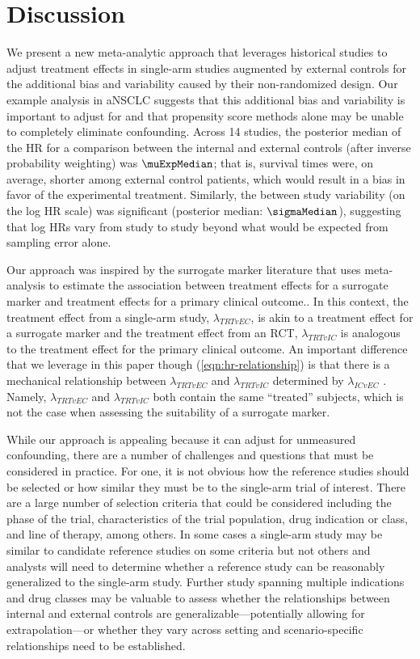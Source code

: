 \documentclass[11pt,final,fleqn]{article}\usepackage[]{graphicx}\usepackage[]{color}
\begin{document}
\section{Discussion} \label{sec:discussion}
We present a new meta-analytic approach that leverages historical studies to adjust treatment effects in single-arm studies augmented by external controls for the additional bias and variability caused by their non-randomized design. Our example analysis in aNSCLC suggests that this additional bias and variability is important to adjust for and that propensity score methods alone may be unable to completely eliminate confounding.  Across 14 studies, the posterior median of the HR for a comparison between the internal and external controls (after inverse probability weighting) was $\muExpMedian$; that is, survival times were, on average, shorter among external control patients, which would result in a bias in favor of the experimental treatment. Similarly, the between study variability (on the log HR scale) was significant (posterior median: $\sigmaMedian$), suggesting that log HRs vary from study to study beyond what would be expected from sampling error alone. 

Our approach was inspired by the surrogate marker literature that uses meta-analysis to estimate the association between treatment effects for a surrogate marker and treatment effects for a primary clinical outcome.\cite{daniels1997meta, burzykowski2006evaluation}. In this context, the treatment effect from a single-arm study, $\lambda_{\textit{TRT}vEC}$, is akin to a treatment effect for a surrogate marker and the treatment effect from an RCT, $\lambda_{\textit{TRT}vIC}$ is analogous to the treatment effect for the primary clinical outcome. An important difference that we leverage in this paper though (\autoref{eqn:hr-relationship}) is that there is a mechanical relationship between $\lambda_{\textit{TRT}vEC}$ and $\lambda_{\textit{TRT}vIC}$ determined by $\lambda_{ICvEC}$ . Namely,  $\lambda_{\textit{TRT}vEC}$ and $\lambda_{\textit{TRT}vIC}$ both contain the same ``treated'' subjects, which is not the case when assessing the suitability of a surrogate marker. 

While our approach is appealing because it can adjust for unmeasured confounding, there are a number of challenges and questions that must be considered in practice. For one, it is not obvious how the reference studies should be selected or how similar they must be to the single-arm trial of interest. There are a large number of selection criteria that could be considered including the phase of the trial, characteristics of the trial population, drug indication or class, and line of therapy, among others. In some cases a single-arm study may be similar to candidate reference studies on some criteria but not others and analysts will need to determine whether a reference study can be reasonably generalized to the single-arm study. Further study spanning multiple indications and drug classes may be valuable to assess whether the relationships between internal and external controls are generalizable---potentially allowing for extrapolation---or whether they vary across setting and scenario-specific relationships need to be established.
\end{document}
